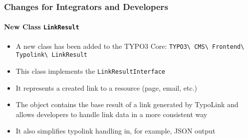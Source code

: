 %

\begin{frame}[fragile]
	\frametitle{Changes for Integrators and Developers}
	\framesubtitle{New Class \texttt{LinkResult}}


	\begin{itemize}
		\item A new class has been added to the TYPO3 Core:\newline
			\small\texttt{TYPO3\textbackslash
				CMS\textbackslash
				Frontend\textbackslash
				Typolink\textbackslash
				LinkResult}\normalsize
		\item This class implements the \texttt{LinkResultInterface}
		\item It represents a created link to a resource (page, email, etc.)
		\item The object contains the base result of a link generated by TypoLink
			and allows developers to handle link data in a more consistent way
		\item It also simplifies typolink handling in, for example, JSON output
	\end{itemize}

\end{frame}

